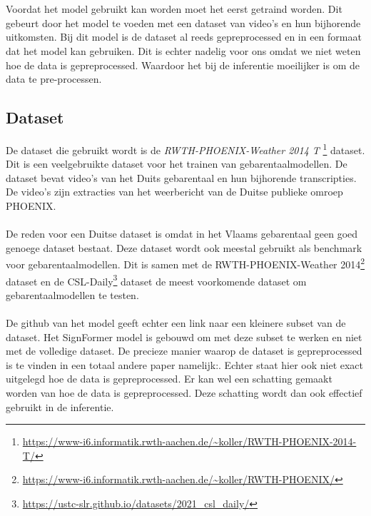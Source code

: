 \chapter{}
\label{ch:trainingvhmodel}
Voordat het model gebruikt kan worden moet het eerst getraind worden.
Dit gebeurt door het model te voeden met een dataset van video's en hun bijhorende uitkomsten.
Bij dit model is de dataset al reeds gepreprocessed en in een formaat dat het model kan gebruiken.
Dit is echter nadelig voor ons omdat we niet weten hoe de data is gepreprocessed.
Waardoor het bij de inferentie moeilijker is om de data te pre-processen.

\section{Dataset}
\label{sec:dataset}

De dataset die gebruikt wordt is de \textit{RWTH-PHOENIX-Weather 2014 T} \footnote{\url{https://www-i6.informatik.rwth-aachen.de/~koller/RWTH-PHOENIX-2014-T/}} dataset.
Dit is een veelgebruikte dataset voor het trainen van gebarentaalmodellen.
De dataset bevat video's van het Duits gebarentaal en hun bijhorende transcripties.
De video's zijn extracties van het weerbericht van de Duitse publieke omroep PHOENIX.
\\
\\
De reden voor een Duitse dataset is omdat in het Vlaams gebarentaal geen goed genoege dataset bestaat.
Deze dataset wordt ook meestal gebruikt als benchmark voor gebarentaalmodellen.
Dit is samen met de RWTH-PHOENIX-Weather 2014\footnote{\url{https://www-i6.informatik.rwth-aachen.de/~koller/RWTH-PHOENIX/}} dataset en de CSL-Daily\footnote{\url{https://ustc-slr.github.io/datasets/2021_csl_daily/}} dataset de meest voorkomende dataset om gebarentaalmodellen te testen.
\\
\\
De github van het model geeft echter een link naar een kleinere subset van de dataset.
Het SignFormer model is gebouwd om met deze subset te werken en niet met de volledige dataset.
De precieze manier waarop de dataset is gepreprocessed is te vinden in een totaal andere paper namelijk:\textcite{SLTS}.
Echter staat hier ook niet exact uitgelegd hoe de data is gepreprocessed.
Er kan wel een schatting gemaakt worden van hoe de data is gepreprocessed.
Deze schatting wordt dan ook effectief gebruikt in de inferentie.


